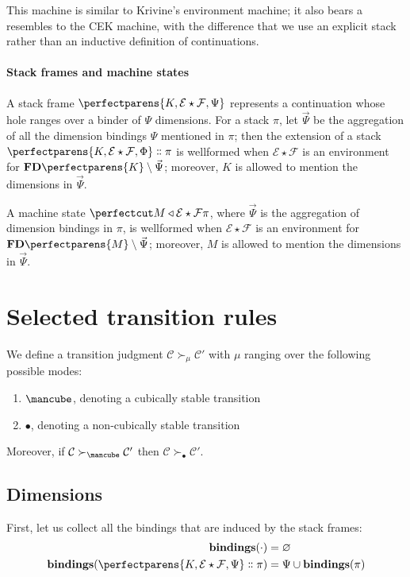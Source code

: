 \documentclass{article}
\newcommand\Env[2]{#1\star{#2}}
\newcommand\StackBindings[1]{\mathbf{bindings} (#1)}
\newcommand\Clo[3]{#1\triangleleft{\Env{#2}{#3}}}
\newcommand\Cons[2]{{#1}\dblcolon{#2}}
\newcommand\FreeDims[1]{\mathbf{FD}\perfectparens{#1}}
\newcommand\Frame[4]{\perfectparens{#1,\Env{#2}{#3},#4}}
\newcommand\Cfg[4]{\cut{\Clo{#1}{#2}{#3}}{#4}}
\newcommand\Stable{\text{\mancube}}
\newcommand\NonStable{\bullet}
\newcommand\Step[3]{{#2}\mathrel{\succ_{#1}}{#3}}
\newcommand\CC{\mathcal{C}}
\newcommand\EE{\mathcal{E}}
\newcommand\FF{\mathcal{F}}
\begin{document}
This machine is similar to Krivine's environment machine; it also
bears a resembles to the CEK machine, with the difference that we use
an explicit stack rather than an inductive definition of
continuations.

\paragraph{Stack frames and machine states}

A stack frame $\Frame{K}{\EE}{\FF}{\Psi}$ represents a continuation
whose hole ranges over a binder of $\Psi$ dimensions. For a stack
$\pi$, let $\vec{\Psi}$ be the aggregation of all the dimension
bindings $\Psi$ mentioned in $\pi$; then the extension of a stack
$\Cons{\Frame{K}{\EE}{\FF}{\Phi}}{\pi}$ is wellformed when
$\Env{\EE}{\FF}$ is an environment for $\FreeDims{K}\setminus\vec{\Psi}$;
moreover, $K$ is allowed to mention the dimensions in $\vec{\Psi}$.

A machine state $\Cfg{M}{\EE}{\FF}{\pi}$, where $\vec{\Psi}$ is the
aggregation of dimension bindings in $\pi$, is wellformed when
$\Env{\EE}{\FF}$ is an environment for $\FreeDims{M}\setminus\vec{\Psi}$;
moreover, $M$ is allowed to mention the dimensions in $\vec{\Psi}$.

\section{Selected transition rules}

We define a transition judgment
$\Step{\mu}{\CC}{\CC'}$ with $\mu$ ranging over
the following possible modes:
\begin{enumerate}
\item $\Stable$, denoting a cubically stable transition
\item $\NonStable$, denoting a non-cubically stable transition
\end{enumerate}

Moreover, if $\Step{\Stable}{\CC}{\CC'}$ then
$\Step{\NonStable}{\CC}{\CC'}$.

\subsection{Dimensions}

First, let us collect all the bindings that are induced by the stack
frames:
\begin{align*}
  \StackBindings{\cdot} &= \varnothing\\
  \StackBindings{\Cons{\Frame{K}{\EE}{\FF}{\Psi}}{\pi}} &= \Psi\cup\StackBindings{\pi}
\end{align*}
\end{document}
